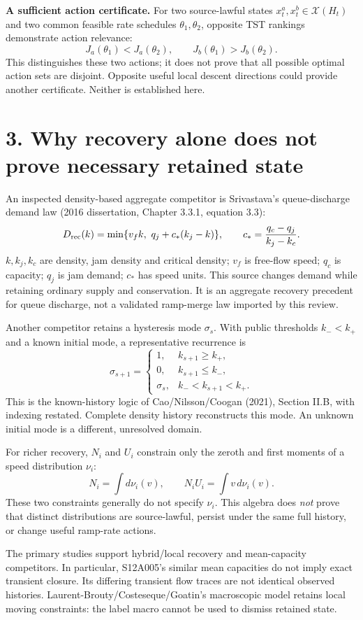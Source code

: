 \documentclass[11pt,a4paper]{article}
\begin{document}
\textbf{A sufficient action certificate.} For two source-lawful states
$x_t^a,x_t^b\in\mathcal X(H_t)$ and two common feasible rate schedules
$\theta_1,\theta_2$, opposite TST rankings demonstrate action relevance:
\[
 J_a(\theta_1)<J_a(\theta_2),\qquad
 J_b(\theta_1)>J_b(\theta_2).
\]
This distinguishes these two actions; it does not prove that all possible optimal
action sets are disjoint. Opposite useful local descent directions could provide
another certificate. Neither is established here.

\newpage
\section*{3. Why recovery alone does not prove necessary retained state}
An inspected density-based aggregate competitor is Srivastava's queue-discharge
demand law (2016 dissertation, Chapter 3.3.1, equation 3.3):
\[
 D_{\rm rec}(k)=\min\{v_fk,\ q_j+c_*(k_j-k)\},\qquad
 c_*=\frac{q_c-q_j}{k_j-k_c}.
\]
$k,k_j,k_c$ are density, jam density and critical density; $v_f$ is free-flow
speed; $q_c$ is capacity; $q_j$ is jam demand; $c_*$ has speed units.
This source changes demand while retaining ordinary supply and conservation.
It is an aggregate recovery precedent for queue discharge, not a validated
ramp-merge law imported by this review.

Another competitor retains a hysteresis mode $\sigma_s$. With public thresholds
$k_-<k_+$ and a known initial mode, a representative recurrence is
\[
 \sigma_{s+1}=
 \begin{cases}
  1,& k_{s+1}\geq k_+,\\
  0,& k_{s+1}\leq k_-,\\
  \sigma_s,& k_-<k_{s+1}<k_+ .
 \end{cases}
\]
This is the known-history logic of Cao/Nilsson/Coogan (2021), Section II.B,
with indexing restated. Complete density history reconstructs this mode.
An unknown initial mode is a different, unresolved domain.

For richer recovery, $N_i$ and $U_i$ constrain only the zeroth and first moments
of a speed distribution $\nu_i$:
\[
 N_i=\int d\nu_i(v),\qquad N_iU_i=\int v\,d\nu_i(v).
\]
These two constraints generally do not specify $\nu_i$. This algebra does
\emph{not} prove that distinct distributions are source-lawful, persist
under the same full history, or change useful ramp-rate actions.

The primary studies support hybrid/local recovery and mean-capacity competitors.
In particular, S12A005's similar mean capacities do not imply exact transient
closure. Its differing transient flow traces are not identical observed
histories. Laurent-Brouty/Costeseque/Goatin's macroscopic model retains local
moving constraints: the label macro cannot be used to dismiss retained state.
\end{document}

